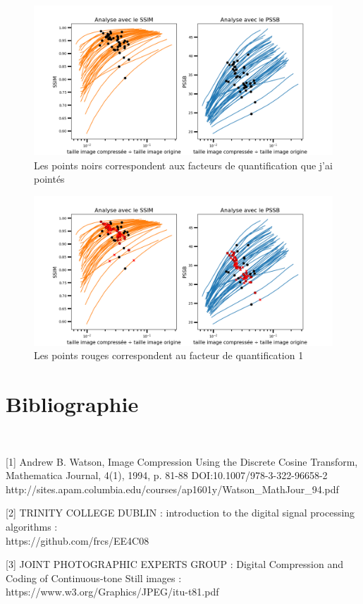 \documentclass{article}
\begin{document}
\begin{figure}[H]
    \centering
    \includegraphics[width=0.7\linewidth]{graphe2.png}
    \caption{Les points noirs correspondent aux facteurs de quantification que j'ai pointés}
\end{figure}


\begin{figure}[H]
    \centering
    \includegraphics[width=0.7\linewidth]{graphe3.png}
    \caption{Les points rouges correspondent au facteur de quantification 1}
\end{figure}


\section{Bibliographie}
\ 

[1] Andrew B. Watson, Image Compression Using the Discrete Cosine Transform, Mathematica Journal, 4(1), 1994, p. 81-88 DOI:10.1007/978-3-322-96658-2 http://sites.apam.columbia.edu/courses/ap1601y/Watson\_MathJour\_94.pdf

\vspace{.4cm}

[2] TRINITY COLLEGE DUBLIN : introduction to the digital signal processing algorithms : \\ https://github.com/frcs/EE4C08

\vspace{.4cm}

[3] JOINT PHOTOGRAPHIC EXPERTS GROUP : Digital Compression and Coding of Continuous-tone Still images : https://www.w3.org/Graphics/JPEG/itu-t81.pdf
\end{document}
